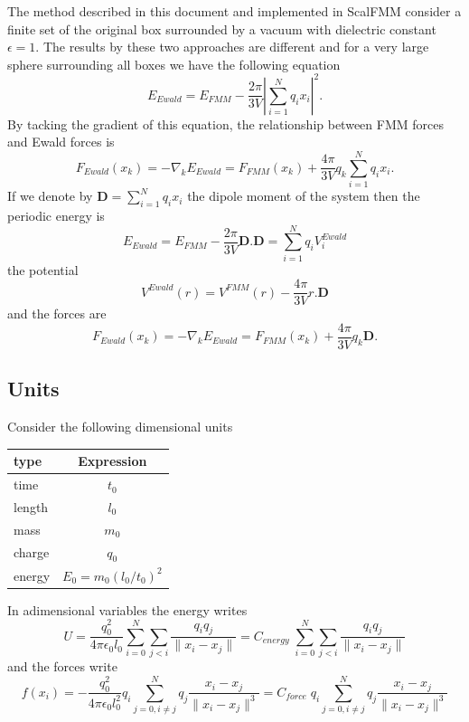\documentclass[12pt]{article} %
\begin{document}
The method described in this document and implemented in ScalFMM consider a finite set of the original box surrounded by a vacuum with dielectric constant $\epsilon=1$. The results by these two approaches are different \cite{DeLeeuw1980, Heyes1981} and for a very large sphere surrounding all boxes we have the following equation
\begin{equation}
E_{Ewald} = E_{FMM} -\frac{2\pi}{3V}|\sum_{i=1}^{N}{q_i x_i}|^2.
\end{equation}
By tacking the gradient of this equation, the relationship between FMM forces and Ewald forces is
\begin{equation}
F_{Ewald}(x_k) = -\nabla_k E_{Ewald} = F_{FMM}(x_k)  + \frac{4\pi}{3V} q_k \sum_{i=1}^{N}{q_i x_i}.
\end{equation}
If we denote by $\mathbf{D}= \sum_{i=1}^{N}{q_i x_i}$ the dipole moment of the system then the periodic energy is   
\begin{equation}
E_{Ewald} = E_{FMM} - \frac{2\pi}{3V}\mathbf{D}.\mathbf{D} =\sum_{i=1}^{N}{q_i V_i^{Ewald}}
\end{equation}
the potential 
\begin{equation}
V^{Ewald}(r) = V^{FMM}(r) - \frac{4\pi}{3V} r.\mathbf{D}  
\end{equation}
and the forces are
\begin{equation}
F_{Ewald}(x_k) = -\nabla_k E_{Ewald} = F_{FMM}(x_k)  + \frac{4\pi}{3V} q_k \mathbf{D}.
\end{equation}


\subsection{Units}
Consider the following dimensional units 
\begin{center}
\begin{tabular}{|l|c|}
\hline
type & Expression  \\
\hline
time &$t_0$ \\
length & $l_0$ \\
mass &  $m_0$ \\
charge &  $q_0$ \\
energy & $E_0 = m_0(l_0/t_0)^2$\\
\hline
\end{tabular}
\end{center}

 In adimensional variables the energy writes 
$$
U = \frac{q_0^2}{4 \pi\epsilon_0 l_0}\sum_{i=0}^{N}{\sum_{j<i}{\frac{q_i q_j}{\|x_i-x_j\|}}}  = C_{energy}  \;\sum_{i=0}^{N}{\sum_{j<i}{\frac{q_i q_j}{\|x_i-x_j\|}}}
$$
and the forces write 
$$
f(x_i) = -\frac{q_0^2}{4 \pi\epsilon_0 l_0^2} q_i \sum_{j=0,i\neq j}^{N}{q_j\frac{x_i-x_j}{\|x_i-x_j\|^3}}
 = C_{force} \; q_i  \sum_{j=0,i\neq j}^{N}{q_j\frac{x_i-x_j}{\|x_i-x_j\|^3}}
$$
\end{document}
